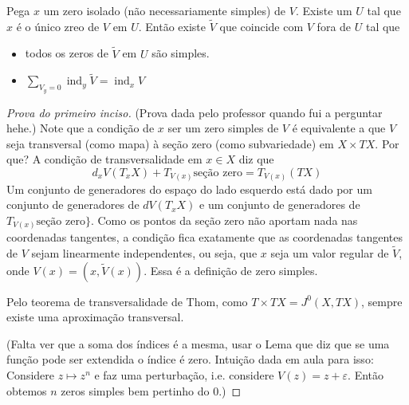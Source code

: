 \begin{exercise}\leavevmode
Pega \(x\) um zero isolado (não necessariamente simples) de \(V\). Existe um \(U\) tal que \(x\) é o único zreo de \(V\) em \(U\). Então existe \(\tilde{V}\) que coincide com \(V\) fora de \(U\) tal que 
\begin{itemize}
\item todos os zeros de \(\tilde{V}\) em \(U\) são simples.
\item \(\sum_{V_y=0}\operatorname{ind}_y \tilde{V}=\operatorname{ind}_xV\)
\end{itemize}
\end{exercise}

\begin{proof}[Prova do primeiro inciso]\leavevmode
	(Prova dada pelo professor quando fui a perguntar hehe.)	Note que a condição de \(x\) ser um zero simples de \(V\) é equivalente a que \(V\) seja transversal (como mapa) à seção zero (como subvariedade) em \(X \times TX\). Por que? A condição de transversalidade em \(x \in X\) diz que
	\[d_xV(T_x X)+T_{V(x)}\text{seção zero} =T_{V(x)}(TX)\]
	Um conjunto de generadores do espaço do lado esquerdo está dado por um conjunto de generadores de \(dV(T_xX)\) e um conjunto de generadores de  \(T_{V(x)}  \text{seção zero} \}\). Como os pontos da seção zero não aportam nada nas coordenadas tangentes, a condição fica exatamente que as coordenadas tangentes de \(V\) sejam linearmente independentes, ou seja, que  \(x\) seja um valor regular de \(\tilde{V}\), onde  \(V(x)=(x,\tilde{V}(x))\). Essa é a definição de zero simples.

	Pelo teorema de transversalidade de Thom, como \(T \times TX= J^0(X,TX)\), sempre existe uma aproximação transversal.

	(Falta ver que a soma dos índices é a mesma, usar o Lema que diz que se uma função pode ser extendida o índice é zero. Intuição dada em aula para isso: Considere \(z \mapsto  z^n\) e faz uma perturbação, i.e. considere \(V(z)=z+\varepsilon\). Então obtemos \(n\) zeros simples bem pertinho do 0.)
\end{proof}

